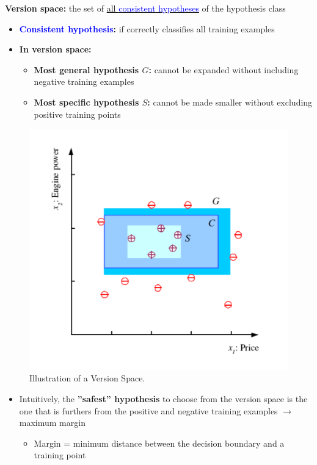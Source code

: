 \documentclass[12pt, a4paper]{article}
\begin{document}
\textbf{Version space:} the set of \uline{all \textcolor{blue}{consistent hypotheses}} of the
hypothesis class

\begin{itemize}
  \item
    \textbf{\textcolor{blue}{Consistent hypothesis}:} if correctly classifies all training
    examples
  \item
    \textbf{In version space:}
  \begin{itemize}
    \item
      \textbf{Most general hypothesis $G$:} cannot be expanded without
      including negative training examples
    \item
      \textbf{Most specific hypothesis $S$:} cannot be made smaller
      without excluding positive training points
  \end{itemize}
\end{itemize}

\begin{figure}[H]
  \centering  %
    \includegraphics[width=0.5\columnwidth]{images/version-space.png}
    \caption{Illustration of a Version Space.}
    \label{fig:fig2}
\end{figure}

\begin{itemize}
\itemsep1pt\parskip0pt
\item
  Intuitively, the \textbf{''safest'' hypothesis} to choose from the
  version space is the one that is furthers from the positive and
  negative training examples $\rightarrow$ maximum margin

  \begin{itemize}
  \itemsep1pt\parskip0pt
  \item
    Margin = minimum distance between the decision boundary and a
    training point
  \end{itemize}
\end{itemize}
\end{document}
